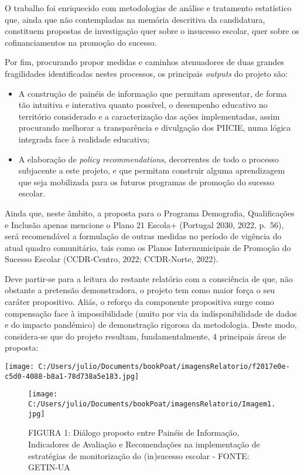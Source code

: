 \documentclass[
]{book}
\providecommand{\tightlist}{%
  \setlength{\itemsep}{0pt}\setlength{\parskip}{0pt}}
\begin{document}
O trabalho foi enriquecido com metodologias de análise e tratamento estatístico que, ainda que não contempladas na memória descritiva da candidatura, constituem propostas de investigação quer sobre o insucesso escolar, quer sobre os cofinanciamentos na promoção do sucesso.

Por fim, procurando propor medidas e caminhos atenuadores de duas grandes fragilidades identificadas nestes processos, os principais \emph{outputs} do projeto são:

\begin{itemize}
\tightlist
\item
  A construção de painéis de informação que permitam apresentar, de forma tão intuitiva e interativa quanto possível, o desempenho educativo no território considerado e a caracterização das ações implementadas, assim procurando melhorar a transparência e divulgação dos PIICIE, numa lógica integrada face à realidade educativa;\\
\item
  A elaboração de \emph{policy recommendations}, decorrentes de todo o processo subjacente a este projeto, e que permitam construir alguma aprendizagem que seja mobilizada para os futuros programas de promoção do sucesso escolar.
\end{itemize}

Ainda que, neste âmbito, a proposta para o Programa Demografia, Qualificações e Inclusão apenas mencione o Plano 21 Escola+ (Portugal 2030, 2022, p.~56), será recomendável a formulação de outras medidas no período de vigência do atual quadro comunitário, tais como os Planos Intermunicipais de Promoção do Sucesso Escolar (CCDR-Centro, 2022; CCDR-Norte, 2022).

Deve partir-se para a leitura do restante relatório com a consciência de que, não obstante a pretensão demonstradora, o projeto tem como maior força o seu caráter propositivo. Aliás, o reforço da componente propositiva surge como compensação face à impossibilidade (muito por via da indisponibilidade de dados e do impacto pandémico) de demonstração rigorosa da metodologia. Deste modo, considera-se que do projeto resultam, fundamentalmente, 4 principais áreas de proposta:

\texttt{[image: C:/Users/julio/Documents/bookPoat/imagensRelatorio/f2017e0e-c5d0-4088-b8a1-78d738a5e183.jpg]}

\begin{figure}
\centering
\texttt{[image: C:/Users/julio/Documents/bookPoat/imagensRelatorio/Imagem1.jpg]}
\caption{FIGURA 1: Diálogo proposto entre Painéis de Informação, Indicadores de Avaliação e Recomendações na implementação de estratégias de monitorização do (in)sucesso escolar - FONTE: GETIN-UA}
\end{figure}
\end{document}
